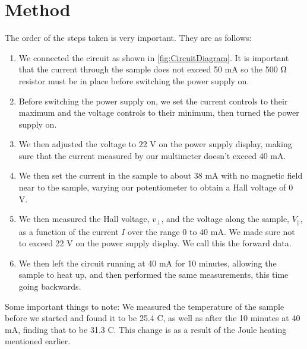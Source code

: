 \documentclass[12pt]{article}
\numberwithin{equation}{section}
\numberwithin{figure}{section}
\numberwithin{table}{section}
\begin{document}
    \section{Method}\label{sec:Method}
    The order of the steps taken is very important. They are as follows:
    \begin{enumerate}
        \item We connected the circuit as shown in \autoref{fig:CircuitDiagram}. It is 
        important that the current through the sample does not exceed 50 mA so the 500 
        $\si[]{\ohm}$ resistor must be in place before switching the power supply on. 
        \item Before switching the power supply on, we set the current controls to their 
        maximum and the voltage controls to their minimum, then turned the power supply on. 
        \item We then adjusted the voltage to 22 V on the power supply display, making sure 
        that the current measured by our multimeter doesn't exceed 40 mA.
        \item We then set the current in the sample to about 38 mA with no magnetic field 
        near to the sample, varying our potentiometer to obtain a Hall voltage of 0 V. 
        \item We then measured the Hall voltage, $v_\perp$, and the voltage along the sample, 
        $V_\parallel$, as a function of the current $I$ over the range 0 to 40 mA. We made sure 
        not to exceed 22 V on the power supply display. We call this the forward data. 
        \item We then left the circuit running at 40 mA for 10 minutes, allowing the sample to 
        heat up, and then performed the same measurements, this time going backwards. 
    \end{enumerate}
    Some important things to note: We measured the temperature of the sample before we started 
    and found it to be 25.4 C, as well as after the 10 minutes at 40 mA, finding that 
    to be 31.3 C. This change is as a result of the Joule heating mentioned earlier. 
    
\end{document}
